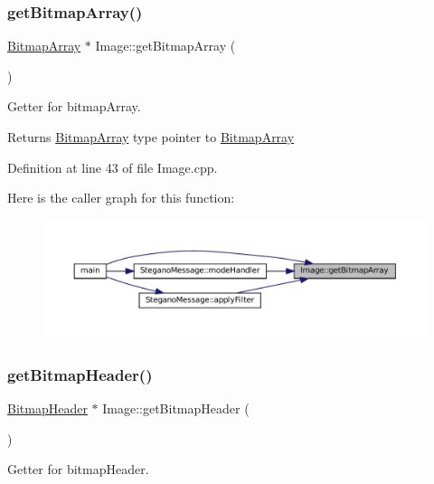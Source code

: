 \subsubsection{\texorpdfstring{getBitmapArray()}{getBitmapArray()}}
{\footnotesize\ttfamily \mbox{\hyperlink{classBitmapArray}{Bitmap\+Array}} $\ast$ Image\+::get\+Bitmap\+Array (\begin{DoxyParamCaption}{ }\end{DoxyParamCaption})}



Getter for bitmap\+Array. 

\begin{DoxyReturn}{Returns}
\mbox{\hyperlink{classBitmapArray}{Bitmap\+Array}} type pointer to \mbox{\hyperlink{classBitmapArray}{Bitmap\+Array}} 
\end{DoxyReturn}


Definition at line 43 of file Image.\+cpp.

Here is the caller graph for this function\+:\nopagebreak
\begin{figure}[H]
\begin{center}
\leavevmode
\includegraphics[width=350pt]{classImage_a75b5051c6cc39a5e3f86d287f5cc7f9c_icgraph}
\end{center}
\end{figure}
\mbox{\label{classImage_a8c824ffac0c866a94752a2c1047932af}} 
\subsubsection{\texorpdfstring{getBitmapHeader()}{getBitmapHeader()}}
{\footnotesize\ttfamily \mbox{\hyperlink{classBitmapHeader}{Bitmap\+Header}} $\ast$ Image\+::get\+Bitmap\+Header (\begin{DoxyParamCaption}{ }\end{DoxyParamCaption})}



Getter for bitmap\+Header. 

